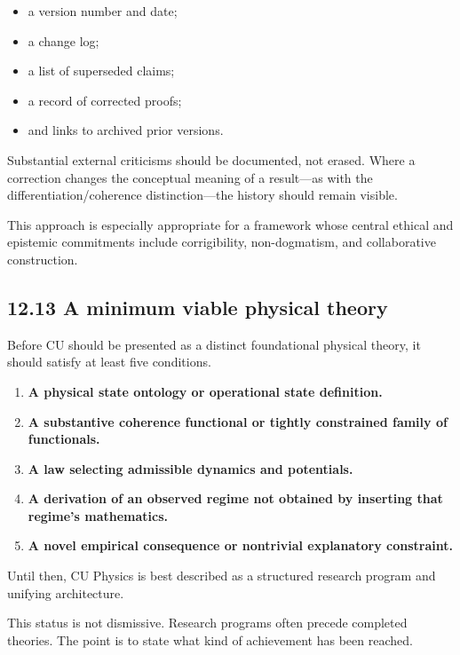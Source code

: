 \documentclass[
  11pt,
]{article}
\providecommand{\tightlist}{%
  \setlength{\itemsep}{0pt}\setlength{\parskip}{0pt}}
\begin{document}
\begin{itemize}
\tightlist
\item
  a version number and date;
\item
  a change log;
\item
  a list of superseded claims;
\item
  a record of corrected proofs;
\item
  and links to archived prior versions.
\end{itemize}

Substantial external criticisms should be documented, not erased. Where
a correction changes the conceptual meaning of a result---as with the
differentiation/coherence distinction---the history should remain
visible.

This approach is especially appropriate for a framework whose central
ethical and epistemic commitments include corrigibility, non-dogmatism,
and collaborative construction.

\subsection{12.13 A minimum viable physical
theory}\label{a-minimum-viable-physical-theory}

Before CU should be presented as a distinct foundational physical
theory, it should satisfy at least five conditions.

\begin{enumerate}
\def\labelenumi{\arabic{enumi}.}
\tightlist
\item
  \textbf{A physical state ontology or operational state definition.}
\item
  \textbf{A substantive coherence functional or tightly constrained
  family of functionals.}
\item
  \textbf{A law selecting admissible dynamics and potentials.}
\item
  \textbf{A derivation of an observed regime not obtained by inserting
  that regime's mathematics.}
\item
  \textbf{A novel empirical consequence or nontrivial explanatory
  constraint.}
\end{enumerate}

Until then, CU Physics is best described as a structured research
program and unifying architecture.

This status is not dismissive. Research programs often precede completed
theories. The point is to state what kind of achievement has been
reached.
\end{document}
